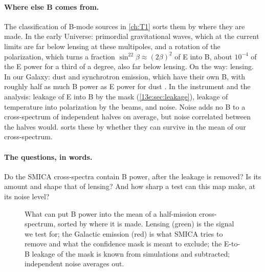 \paragraph{Where else B comes from.} The classification of B-mode sources in \cref{ch:T1} sorts them by
where they are made. In the early Universe: primordial gravitational waves, which at the current limits are
far below lensing at these multipoles, and a rotation of the polarization, which turns a fraction
$\sin^22\beta\approx(2\beta)^2$ of E into B, about $10^{-4}$ of the E power for a third of a degree, also far below
lensing. On the way: lensing. In our Galaxy: dust and synchrotron emission, which have their own B, with
roughly half as much B power as E power for dust \cite{Planck2018XI}. In the instrument and the analysis:
leakage of E into B by the mask (\cref{13e:sec:leakage}), leakage of temperature into polarization by the beams,
and noise. Noise adds no B to a cross-spectrum of independent halves on average, but noise correlated between the
halves would.  sorts these by whether they can survive in the mean of our
cross-spectrum.

\paragraph{The questions, in words.} Do the SMICA cross-spectra contain B power, after the leakage is removed?
Is its amount and shape that of lensing? And how sharp a test can this map make, at its noise level?

\begin{figure}[htbp]
\centering
{}
\caption{What can put B power into the mean of a half-mission cross-spectrum, sorted by where it is made.
Lensing (green) is the signal we test for; the Galactic emission (red) is what SMICA tries to remove and what
the confidence mask is meant to exclude; the E-to-B leakage of the mask is known from simulations and
subtracted; independent noise averages out.}
\label{13e:fig:bsources}
\end{figure}

